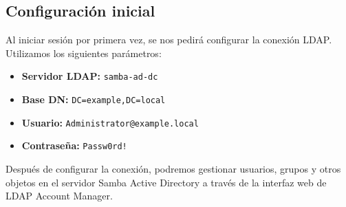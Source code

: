\subsection{Configuración inicial}
Al iniciar sesión por primera vez, se nos pedirá configurar la conexión LDAP. Utilizamos los
siguientes parámetros:
\begin{itemize}
    \item \textbf{Servidor LDAP:} \texttt{samba-ad-dc}
    \item \textbf{Base DN:} \texttt{DC=example,DC=local}
    \item \textbf{Usuario:} \texttt{Administrator@example.local}
    \item \textbf{Contraseña:} \texttt{Passw0rd!}
\end{itemize}
Después de configurar la conexión, podremos gestionar usuarios, grupos y otros objetos en el
servidor Samba Active Directory a través de la interfaz web de LDAP Account Manager.

